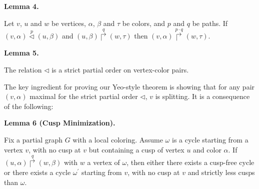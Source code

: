\documentclass[10pt,a4paper]{amsart}
\begin{document}
 
 
 
\par\medskip\noindent\textbf{Lemma 4.}\par
 
 
Let $v$, $u$ and $w$ be vertices, $\alpha$, $\beta$ and $\tau$ be colors, and $p$ and $q$ be paths. If $(v,\alpha)\overset{p}{\lhd}(u,\beta)$ and $(u,\beta)\overset{q}{\Rsh}(w,\tau)$ then $(v,\alpha)\overset{p\cdot q}{\Rsh}(w,\tau)$.\par
 
 
 
 
\par\medskip\noindent\textbf{Lemma 5.}\par
 
 
The relation $\lhd$ is a strict partial order on vertex-color pairs.\par
 
 
 
 
The key ingredient for proving our Yeo-style theorem is showing that for any pair $(v,\alpha)$ maximal for the strict partial order $\lhd$, $v$ is splitting. It is a consequence of the following:\par
 
 
 
\par\medskip\noindent\textbf{Lemma 6 (Cusp Minimization).}\par
 
 
Fix a partial graph $G$ with a local coloring. Assume $\omega$ is a cycle starting from a vertex $v$, with no cusp at $v$ but containing a cusp of vertex $u$ and color $\alpha$. If $(u,\alpha)\overset{q}{\Rsh}(w,\beta)$ with $w$ a vertex of $\omega$, then either there exists a cusp-free cycle or there exists a cycle $\omega^{\prime}$ starting from $v$, with no cusp at $v$ and strictly less cusps than $\omega$.\par
 
\end{document}
